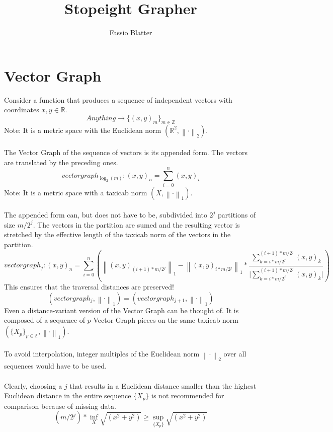 \documentclass{report}
\newcommand\norm[1]{\left\lVert#1\right\rVert}
\begin{document}
\title{Stopeight Grapher}
\author{Fassio Blatter}
\maketitle

\chapter{Vector Graph}
Consider a function that produces a sequence of independent vectors with coordinates $x,y \in \mathbb{R}$.
\begin{equation}
Anything \rightarrow \{(x,y)_{m}\}_{m \in \mathbb{Z}}
\end{equation}
Note: It is a metric space with the Euclidean norm $(\mathbb{R}^2,\norm{\cdot}_2)$.\\\\
The Vector Graph of the sequence of vectors is its appended form. The vectors are translated by the preceding ones.\\
\begin{equation}
vectorgraph_{\log_{2}(m)}: (x,y)_{n}=\sum_{i=0}^{n} (x,y)_{i}
\end{equation}
Note: It is a metric space with a taxicab norm $(X,\norm{\cdot}_1)$.\\\\
The appended form can, but does not have to be, subdivided into $2^j$ partitions of size $m/2^j$. The vectors in the partition are sumed and the resulting vector is stretched by the effective length of the taxicab norm of the vectors in the partition.
\begin{equation}
vectorgraph_{j}:(x,y)_{n}=\sum_{i=0}^{n} (\norm{(x,y)_{(i+1)*m/2^j}}_{1} - \norm{(x,y)_{i*m/2^j}}_{1} * \frac{\sum_{k=i*m/2^j}^{(i+1)*m/2^j} (x,y)_{k}}{\vert \sum_{k=i*m/2^j}^{(i+1)*m/2^j} (x,y)_{k} \vert})
\end{equation}
This ensures that the traversal distances are preserved!
\begin{equation}
(vectorgraph_{j},\norm{\cdot}_{1})=(vectorgraph_{j+1},\norm{\cdot}_{1})
\end{equation}
Even a distance-variant version of the Vector Graph can be thought of. It is composed of a sequence of $p$ Vector Graph pieces on the same taxicab norm $(\{X_{p}\}_{p\in \mathbb{Z}},\norm{\cdot}_1)$.\\\\
To avoid interpolation, integer multiples of the Euclidean norm $\norm{\cdot}_{2}$ over all sequences would have to be used.\\\\
Clearly, choosing a $j$ that results in a Euclidean distance smaller than the highest Euclidean distance in the entire sequence $\{X_{p}\}$ is not recommended for comparison because of missing data.
\begin{equation}
(m/2^j)*\inf \limits _{X} \sqrt{(x^2+y^2)} \geq \sup \limits _{\{X_{p}\}} \sqrt{(x^2+y^2)}
\end{equation}

\iffalse
\printbibliography
\fi
{}

\end{document}
